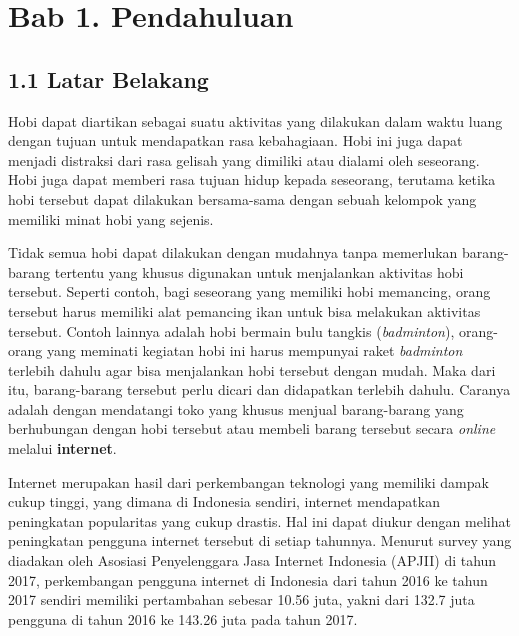 \documentclass[a4paper]{article}
\begin{document}
\newpage
\section*{Bab 1. Pendahuluan}

\subsection*{1.1 Latar Belakang}

Hobi dapat diartikan sebagai suatu aktivitas yang dilakukan dalam waktu luang dengan tujuan untuk mendapatkan rasa kebahagiaan. Hobi ini juga dapat menjadi distraksi dari rasa gelisah yang dimiliki atau dialami oleh seseorang. Hobi juga dapat memberi rasa tujuan hidup kepada seseorang, terutama ketika hobi tersebut dapat dilakukan bersama-sama dengan sebuah kelompok yang memiliki minat hobi yang sejenis\autocite{zaidi2022passion}.

Tidak semua hobi dapat dilakukan dengan mudahnya tanpa memerlukan barang-barang tertentu yang khusus digunakan untuk menjalankan aktivitas hobi tersebut. Seperti contoh, bagi seseorang yang memiliki hobi memancing, orang tersebut harus memiliki alat pemancing ikan untuk bisa melakukan aktivitas tersebut. Contoh lainnya adalah hobi bermain bulu tangkis (\textit{badminton}), orang-orang yang meminati kegiatan hobi ini harus mempunyai raket \textit{badminton} terlebih dahulu agar bisa menjalankan hobi tersebut dengan mudah. Maka dari itu, barang-barang tersebut perlu dicari dan didapatkan terlebih dahulu. Caranya adalah dengan mendatangi toko yang khusus menjual barang-barang yang berhubungan dengan hobi tersebut atau membeli barang tersebut secara \textit{online} melalui \textbf{internet}.

Internet merupakan hasil dari perkembangan teknologi yang memiliki dampak cukup tinggi, yang dimana di Indonesia sendiri, internet mendapatkan peningkatan popularitas yang cukup drastis. Hal ini dapat diukur dengan melihat peningkatan pengguna internet tersebut di setiap tahunnya. Menurut survey yang diadakan oleh Asosiasi Penyelenggara Jasa Internet Indonesia (APJII) di tahun 2017, perkembangan pengguna internet di Indonesia dari tahun 2016 ke tahun 2017 sendiri memiliki pertambahan sebesar 10.56 juta, yakni dari 132.7 juta pengguna di tahun 2016 ke 143.26 juta pada tahun 2017\autocite{indonesia2017infografis}.
\end{document}
